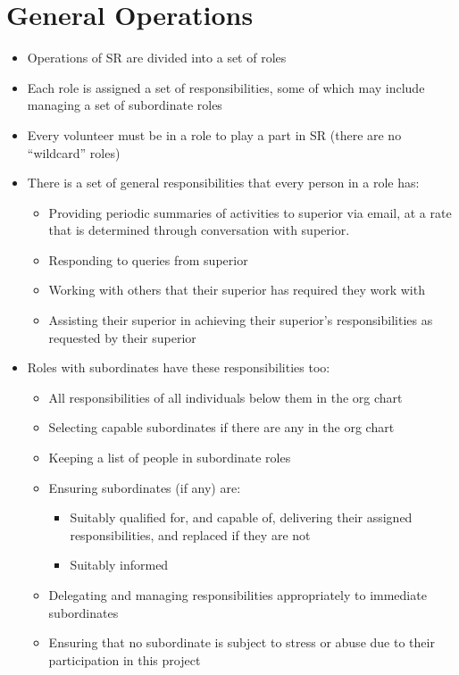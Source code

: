 \chapter{General Operations}


\begin{itemize}
\item Operations of SR are divided into a set of roles
\item Each role is assigned a set of responsibilities, some of which may include managing a set of subordinate roles
\item Every volunteer must be in a role to play a part in SR (there are no ``wildcard'' roles)
\item There is a set of general responsibilities that every person in a role has:
  \begin{itemize}
  \item Providing periodic summaries of activities to superior via email, at a rate that is determined through conversation with superior.
  \item Responding to queries from superior
  \item Working with others that their superior has required they work with
  \item Assisting their superior in achieving their superior's responsibilities as requested by their superior
  \end{itemize}
\item Roles with subordinates have these responsibilities too:
  \begin{itemize}
    \item All responsibilities of all individuals below them in the org chart
    \item Selecting capable subordinates if there are any in the org chart
    \item Keeping a list of people in subordinate roles
    \item Ensuring subordinates (if any) are:
      \begin{itemize}
      \item Suitably qualified for, and capable of, delivering their assigned responsibilities, and replaced if they are not
      \item Suitably informed
      \end{itemize}
    \item Delegating and managing responsibilities appropriately to immediate subordinates
    \item Ensuring that no subordinate is subject to stress or abuse due to their participation in this project
  \end{itemize}
\end{itemize}

